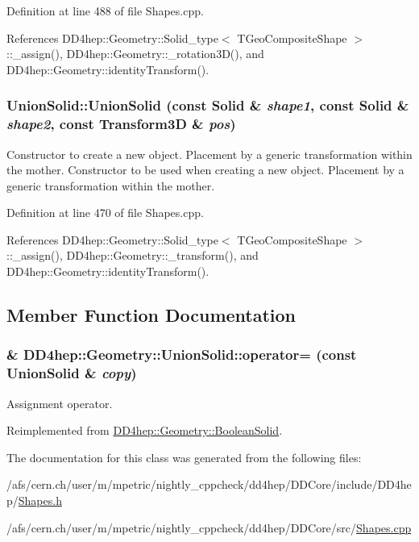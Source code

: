 Definition at line 488 of file Shapes.cpp.

References DD4hep::Geometry::Solid\_\-type$<$ TGeoCompositeShape $>$::\_\-assign(), DD4hep::Geometry::\_\-rotation3D(), and DD4hep::Geometry::identityTransform().\hypertarget{class_d_d4hep_1_1_geometry_1_1_union_solid_ad75ca3619515031cb82d0474bd8c6fc2}{
\subsubsection[{UnionSolid}]{\setlength{\rightskip}{0pt plus 5cm}UnionSolid::UnionSolid (const {\bf Solid} \& {\em shape1}, \/  const {\bf Solid} \& {\em shape2}, \/  const {\bf Transform3D} \& {\em pos})}}
\label{class_d_d4hep_1_1_geometry_1_1_union_solid_ad75ca3619515031cb82d0474bd8c6fc2}


Constructor to create a new object. Placement by a generic transformation within the mother. Constructor to be used when creating a new object. Placement by a generic transformation within the mother. 

Definition at line 470 of file Shapes.cpp.

References DD4hep::Geometry::Solid\_\-type$<$ TGeoCompositeShape $>$::\_\-assign(), DD4hep::Geometry::\_\-transform(), and DD4hep::Geometry::identityTransform().

\subsection{Member Function Documentation}
\hypertarget{class_d_d4hep_1_1_geometry_1_1_union_solid_a797ed87b05428ba918935e35562cb364}{
\subsubsection[{operator=}]{\& DD4hep::Geometry::UnionSolid::operator= (const {\bf UnionSolid} \& {\em copy})}}
\label{class_d_d4hep_1_1_geometry_1_1_union_solid_a797ed87b05428ba918935e35562cb364}


Assignment operator. 

Reimplemented from \hyperlink{class_d_d4hep_1_1_geometry_1_1_boolean_solid_a454e550eb5ec2c515b1c38bc8dc54914}{DD4hep::Geometry::BooleanSolid}.

The documentation for this class was generated from the following files:\begin{DoxyCompactItemize}
\item 
/afs/cern.ch/user/m/mpetric/nightly\_\-cppcheck/dd4hep/DDCore/include/DD4hep/\hyperlink{_shapes_8h}{Shapes.h}\item 
/afs/cern.ch/user/m/mpetric/nightly\_\-cppcheck/dd4hep/DDCore/src/\hyperlink{_shapes_8cpp}{Shapes.cpp}\end{DoxyCompactItemize}
